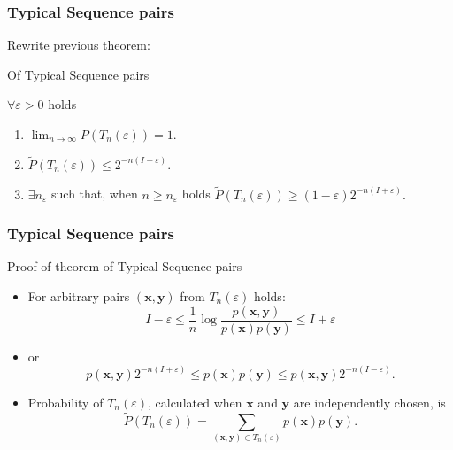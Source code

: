 \documentclass[14pt]{beamer}
\renewcommand{\vec}[1]{\ensuremath{\boldsymbol{#1}}}
\begin{document}
\begin{frame}
\frametitle{Typical Sequence pairs}
\begin{itemize}
    Rewrite previous theorem:
    \begin{theorem} {Of Typical Sequence pairs} \label{TYP_PAIR}
    
        $\forall \varepsilon > 0$ holds
        \begin{enumerate}
        \item
        $\lim_{n\rightarrow \infty} P\left(T_n(\varepsilon)\right)=1.$
        \item
        $\tilde P\left(T_n(\varepsilon)\right)\le 2^{-n(I-\varepsilon)}. $
        \item
        $\exists n_\varepsilon$ such that, when $n \ge n_\varepsilon$ holds 
        $\tilde P\left(T_n(\varepsilon)\right)\ge (1-\varepsilon)2^{-n(I+\varepsilon)}. $
        \end{enumerate}
    \end{theorem}
        
\end{itemize}
\end{frame}



\begin{frame}
\frametitle{Typical Sequence pairs}
Proof of theorem of Typical Sequence pairs
\begin{itemize}

    \item For arbitrary pairs $({\vec x},{\vec y})$ from  $T_n(\varepsilon)$ holds:
    \[
    I-\varepsilon \le
    \frac{1}{n}\log\frac{p(\vec x,\vec y)}{p(\vec x)p(\vec y)}
    \le I+\varepsilon
    \]
    
    \item or
    \begin{equation}\label{pxpy}
    p(\vec x,\vec y)2^{-n(I+\varepsilon)} \le
    p(\vec x)p(\vec y) \le
    p(\vec x,\vec y)2^{-n(I-\varepsilon)}.
    \end{equation}
    
    \item Probability of $T_n(\varepsilon)$, calculated when ${\vec x}$ and ${\vec y}$ are independently chosen, is
    \begin{equation}\label{pr_typ}
    \tilde P\left(T_n(\varepsilon)\right)= \sum_{( {\vec x}, {\vec y})\in T_n(\varepsilon)} p( {\vec x})p({\vec y}).
    \end{equation}
    
\end{itemize}
\end{frame}
\end{document}
